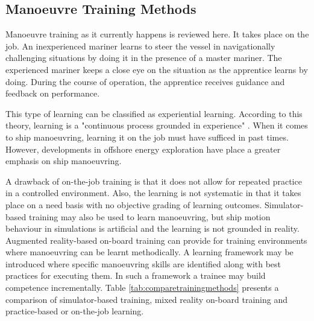 %

\subsection{Manoeuvre Training Methods}
Manoeuvre training as it currently happens is reviewed here. It takes place on the job. An inexperienced mariner learns to steer the vessel in navigationally challenging situations by doing it in the presence of a master mariner. The experienced mariner keeps a close eye on the situation as the apprentice learns by doing. During the course of operation, the apprentice receives guidance and feedback on performance. 

This type of learning can be classified as experiential learning. According to this theory, learning is a "continuous process grounded in experience" \parencite{kolb2005learning}. When it comes to ship manoeuvring, learning it on the job must have sufficed in past times. However, developments in offshore energy exploration have place a greater emphasis on ship manoeuvring. 

A drawback of on-the-job training is that it does not allow for repeated practice in a controlled environment. Also, the learning is not systematic in that it takes place on a need basis with no objective grading of learning outcomes. Simulator-based training may also be used to learn manoeuvring, but ship motion behaviour in simulations is artificial and the learning is not grounded in reality. Augmented reality-based on-board training can provide for training environments where manoeuvring can be learnt methodically. A learning framework may be introduced where specific manoeuvring skills are identified along with best practices for executing them. In such a framework a trainee may build competence incrementally. Table \ref{tab:comparetrainingmethods} presents a comparison of simulator-based training, mixed reality on-board training and practice-based or on-the-job learning. 

